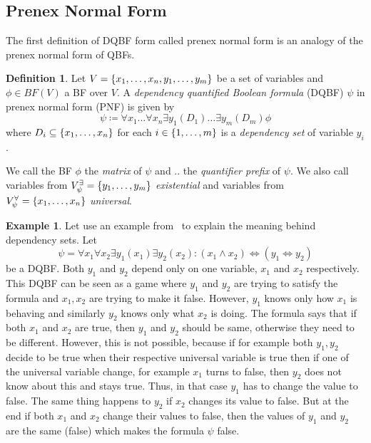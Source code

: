 \documentclass[
  digital, %
  twoside, %
  table,   %
  nolof,     %
  nolot,     %
]{fithesis3}
\let\setbuilder\set
\newcommand{\simpleset}[1]{\{{#1}\}}
\renewcommand{\set}[1]{\normalexpandarg\IfSubStr{#1}{|}{\setbuilder{#1}}{\simpleset{#1}}}
\theoremstyle{definition}
\newtheorem{definition}{Definition}
\newtheorem{example}{Example}
\theoremstyle{remark}
\newcommand{\BF}[1]{BF(#1)}
\newcommand{\evars}[1]{V_{#1}^{\exists}}
\newcommand{\uvars}[1]{V_{#1}^{\forall}}
\newcommand{\lequal}{\Leftrightarrow}
\begin{document}
\subsection{Prenex Normal Form}
The first definition of DQBF form called prenex normal form is an analogy of the prenex normal form of QBFs.


\begin{definition}
  Let $V = \set{x_1, \dots, x_n, y_1, \dots, y_m}$ be a set of variables and $\phi \in \BF{V}$ a BF over $V$. A \emph{dependency quantified Boolean formula} (DQBF) $\psi$ in prenex normal form (PNF) is given by
  \[\psi \coloneqq \forall x_1 \dots \forall x_n \exists y_1 (D_1) \dots \exists y_m (D_m) \phi\]
  where $D_i \subseteq \set{x_1, \dots, x_n}$ for each $i \in \set{1,\dots,m}$ is a \emph{dependency set} of variable $y_i$.
  \label{def:DQBF:PNF}
\end{definition}
We call the BF $\phi$ the \emph{matrix} of $\psi$ and .. the \emph{quantifier prefix} of $\psi$. We also call variables from $\evars{\psi} = \set{y_1,\dots,y_m}$ \emph{existential} and variables from $\uvars{\psi} = \set{x_1,\dots,x_n}$ \emph{universal}.



\begin{example}
Let use an example from~\cite{DQBFProofSystem} to explain the meaning behind dependency sets. Let 
\[\psi = \forall x_1 \forall x_2 \exists y_1 (x_1) \exists y_2 (x_2) : (x_1 \land x_2) \lequal (y_1 \lequal y_2)\]
be a DQBF. Both $y_1$ and $y_2$ depend only on one variable, $x_1$ and $x_2$ respectively. This DQBF can be seen as a game where $y_1$  and $y_2$ are trying to satisfy the formula and $x_1,x_2$ are trying to make it false. However, $y_1$ knows only how $x_1$ is behaving and similarly $y_2$ knows only what $x_2$ is doing.  The formula says that if both $x_1$ and $x_2$ are true, then $y_1$ and $y_2$ should be same, otherwise they need to be different. However, this is not possible, because if for example both $y_1,y_2$ decide to be true when their respective universal variable is true then if one of the universal variable change, for example $x_1$ turns to false, then $y_2$ does not know about this and stays true. Thus, in that case $y_1$ has to change the value to false. The same thing happens to $y_2$ if $x_2$ changes its value to false. But at the end if both $x_1$ and $x_2$ change their values to false, then the values of $y_1$ and $y_2$ are the same (false) which makes the formula $\psi$ false.
\end{example}
\end{document}
